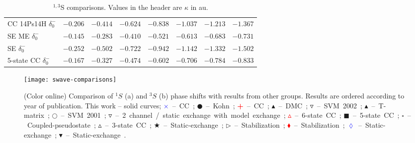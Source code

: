 \documentclass[Dissertation.tex]{subfiles}
\begin{document}
\begin{table}[H]
\begin{tabular}{l c c c c c c c}
CC 14Ps14H \cite{Blackwood2002} $\delta_0^-$ & $-0.206$ & $-0.414$ & $-0.624$ & $-0.838$ & $-1.037$ & $-1.213$ & $-1.367$ \\
SE ME \cite{Biswas2001} $\delta_0^-$ & $-0.145$ & $-0.283$ & $-0.410$ & $-0.521$ & $-0.613$ & $-0.683$ & $-0.731$ \\
SE \cite{Ray1997} $\delta_0^-$ & $-0.252$ & $-0.502$ & $-0.722$ & $-0.942$ & $-1.142$ & $-1.332$ & $-1.502$ \\
5-state CC \cite{Adhikari1999} $\delta_0^-$ & $-0.167$ & $-0.327$ & $-0.474$ & $-0.602$ & $-0.706$ & $-0.784$ & $-0.833$ \\
\bottomrule
\end{tabular}
\caption{$^{1,3}$S comparisons. Values in the header are $\kappa$ in au.}
\label{tab:SWaveComparisons}
\end{table}


\begin{figure}[H]
	\centering
	\texttt{[image: swave-comparisons]}
	\caption[Comparison of $^1S$ and $^3S$ phase shifts]{(Color online) Comparison of $^1S$ (a) and $^3S$ (b) phase shifts
with results from other groups. Results are ordered according to year of
publication. This work -- solid curves;
\mbox{\textcolor{blue}{$\times$} -- CC \cite{Walters2004};}
\mbox{$\CIRCLE$ -- Kohn \cite{VanReeth2003};}
\mbox{\textcolor{red}{\textbf{+}} -- CC \cite{Blackwood2002};}
\mbox{$\blacktriangle$ -- DMC \cite{Chiesa2002};} 
\mbox{$\triangledown$ -- SVM 2002 \cite{Ivanov2002};} 
\mbox{\textcolor[RGB]{0,127,0}{$\blacktriangle$} -- T-matrix \cite{Biswas2002a};} 
\mbox{$\Circle$ -- SVM 2001 \cite{Ivanov2001};} 
\mbox{\textcolor[RGB]{0,127,0}{$\triangledown$} -- 2 channel / static exchange with model exchange \cite{Biswas2001};} 
\mbox{\textcolor{red}{$\vartriangle$} -- 6-state CC \cite{Sinha2000};} 
\mbox{$\blacksquare$ -- 5-state CC \cite{Adhikari1999};} 
\mbox{$\square$ -- Coupled-pseudostate \cite{Campbell1998};} 
\mbox{$\vartriangle$ -- 3-state CC \cite{Sinha1997};} 
\mbox{\textcolor[RGB]{0,127,0}{$\bigstar$} -- Static-exchange \cite{Ray1997};} 
\mbox{$\triangleright$ -- Stabilization \cite{Drachman1976};} 
\mbox{\textcolor{red}{$\blacklozenge$} -- Stabilization \cite{Drachman1975};}
\mbox{\textcolor{blue}{$\lozenge$} -- Static-exchange \cite{Hara1975};}
\mbox{$\blacktriangledown$ -- Static-exchange \cite{Fraser1961}.}}
	\label{fig:SWaveComparisons}
\end{figure}
\end{document}
